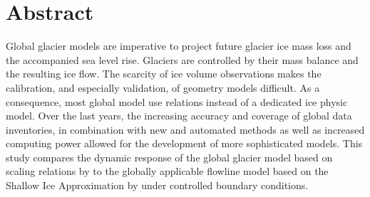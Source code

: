 \chapter*{Abstract}
\thispagestyle{plain}



\small
Global glacier models are imperative to project future glacier ice mass loss and the accompanied sea level rise. Glaciers are controlled by their mass balance and the resulting ice flow.
The scarcity of ice volume observations makes the calibration, and especially validation, of geometry models difficult. As a consequence, most global model use \vas{} relations instead of a dedicated ice physic model. Over the last years, the increasing accuracy and coverage of global data inventories, in combination with new and automated methods as well as increased computing power allowed for the development of more sophisticated models. This study compares the dynamic response of the global glacier model based on scaling relations by \citet{Marzeion2012b} to the globally applicable flowline model based on the Shallow Ice Approximation by \citet{Maussion2019} under controlled boundary conditions.

